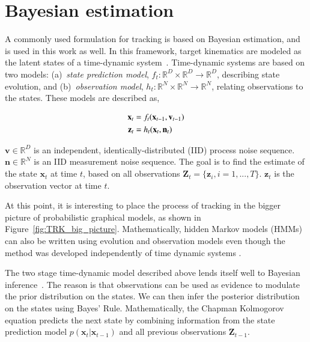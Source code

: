 \section{Bayesian estimation}
A commonly used formulation for tracking is based on Bayesian estimation, and is used in this work as well.  In this framework, target kinematics are modeled as the latent states of a time-dynamic system~\cite{2002_JNL_PF_Arulampalam}.  Time-dynamic systems are based on two models: (a)~\emph{state prediction model}, ${f_t:\mathbb{R}^D \times \mathbb{R}^D \rightarrow \mathbb{R}^D}$, describing state evolution, and (b)~\emph{observation model}, ${h_t:\mathbb{R}^N \times \mathbb{R}^N \rightarrow\mathbb{R}^N}$, relating observations to the states.  These models are described as,

\begin{align}
\mathbf{x}_t &= f_t(\mathbf{x}_{t-1}, \mathbf{v}_{t-1}) \notag\\
\mathbf{z}_t &= h_t(\mathbf{x}_t, \mathbf{n}_t)
\label{Eq:TDS}
\end{align}

$\mathbf{v} \in \mathbb{R}^D$ is an independent, identically-distributed (IID) process noise sequence.  $\mathbf{n} \in \mathbb{R}^N$ is an IID measurement noise sequence.  The goal is to find the estimate of the state $\mathbf{x}_t$ at time $t$, based on all observations $\mathbf{Z}_t={\{\mathbf{z}_i, i=1,...,T\}}$.   $\mathbf{z}_t$ is the observation vector at time $t$.  

At this point, it is interesting to place the process of tracking in the bigger picture of probabilistic graphical models, as shown in Figure~\ref{fig:TRK_big_picture}.  Mathematically, hidden Markov models (HMMs) can also be written using evolution and observation models even though the method was developed independently of time dynamic systems \cite{2007_BOOK_PRML_Bishop}.  

The two stage time-dynamic model described above lends itself well to Bayesian inference~\cite{2002_JNL_PF_Arulampalam}.  The reason is that observations can be used as evidence to modulate the prior distribution on the states.  We can then infer the posterior distribution on the states using Bayes' Rule.  Mathematically, the Chapman Kolmogorov equation predicts the next state by combining information from the state prediction model $p(\mathbf{x}_t| \mathbf{x}_{t-1})$ and all previous observations $\mathbf{Z}_{t-1}$.  %

